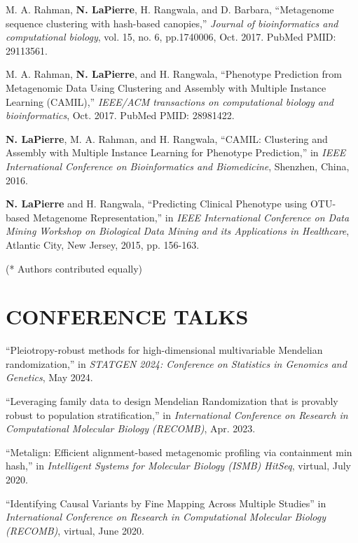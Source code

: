 \documentclass[margin, 10pt]{res} %
\begin{document}
\begin{resume}
M. A. Rahman, \textbf{N. LaPierre}, H. Rangwala, and D. Barbara, ``Metagenome sequence clustering with hash-based canopies,'' \emph{Journal of bioinformatics and computational biology}, vol. 15, no. 6, pp.1740006, Oct. 2017. PubMed PMID: 29113561.

M. A. Rahman, \textbf{N. LaPierre}, and H. Rangwala, ``Phenotype Prediction from Metagenomic Data Using Clustering and Assembly with Multiple Instance Learning (CAMIL),'' \emph{IEEE/ACM transactions on computational biology and bioinformatics}, Oct. 2017. PubMed PMID: 28981422.

\textbf{N. LaPierre}, M. A. Rahman, and H. Rangwala, ``CAMIL: Clustering and Assembly with Multiple Instance Learning for Phenotype Prediction,'' in {\sl IEEE International Conference on Bioinformatics and Biomedicine}, Shenzhen, China, 2016.

\textbf{N. LaPierre} and H. Rangwala, ``Predicting Clinical Phenotype using OTU-based Metagenome Representation,'' in {\sl IEEE International Conference on Data Mining Workshop on Biological Data Mining and its Applications in Healthcare}, Atlantic City, New Jersey, 2015, pp. 156-163.

(*  Authors contributed equally)




\section{CONFERENCE TALKS}

``Pleiotropy-robust methods for high-dimensional multivariable Mendelian randomization,'' in {\sl STATGEN 2024: Conference on Statistics in Genomics and Genetics}, May 2024.

``Leveraging family data to design Mendelian Randomization that is provably robust to population stratification,'' in {\sl International Conference on Research in Computational Molecular Biology (RECOMB)}, Apr. 2023.

``Metalign: Efficient alignment-based metagenomic profiling via containment min hash,'' in {\sl Intelligent Systems for Molecular Biology (ISMB) HitSeq}, virtual, July 2020.

``Identifying Causal Variants by Fine Mapping Across Multiple Studies'' in {\sl International Conference on Research in Computational Molecular Biology (RECOMB)}, virtual, June 2020.


\end{resume}
\end{document}
